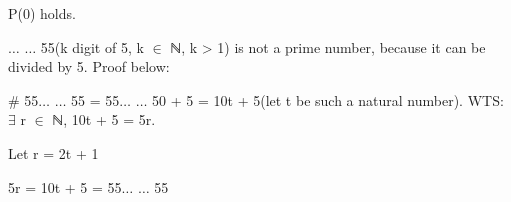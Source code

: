 \documentclass[12pt]{article}
\renewcommand{\_}{\kern-1.5pt\textunderscore\kern-1.5pt}
\begin{document}
\begin{enumerate}
\begin{enumerate}
\begin{FlushLeft}
{\fontsize{14pt}{16.8pt}\selectfont P(0) holds.\par}
\end{FlushLeft}\par


\vspace{\baselineskip}
\begin{FlushLeft}
\end{FlushLeft}\par

\begin{FlushLeft}
\tab {}
\end{FlushLeft}\par

\begin{FlushLeft}
\tab {}
\end{FlushLeft}\par

\begin{FlushLeft}
{\fontsize{14pt}{16.8pt}$ \ldots $ $ \ldots $ 55(k digit of 5, k $ \in $  ℕ, k > 1) is not a prime number, because it can be divided by 5. Proof below:\par}
\end{FlushLeft}\par

\begin{FlushLeft}
{\fontsize{14pt}{16.8pt}\selectfont $\#$  55$ \ldots $ $ \ldots $ 55 = 55$ \ldots $ $ \ldots $ 50 + 5 = 10t + 5(let t be such a natural number). WTS: $ \exists $  r $ \in $  ℕ, 10t + 5 = 5r.\par}
\end{FlushLeft}\par

\begin{FlushLeft}
{\fontsize{14pt}{16.8pt}\selectfont Let r = 2t + 1\par}
\end{FlushLeft}\par

\begin{FlushLeft}
{\fontsize{14pt}{16.8pt}\selectfont 5r = 10t + 5 = 55$ \ldots $ $ \ldots $ 55 \par}
\end{FlushLeft}\par


\end{enumerate}
\end{enumerate}
\end{document}
